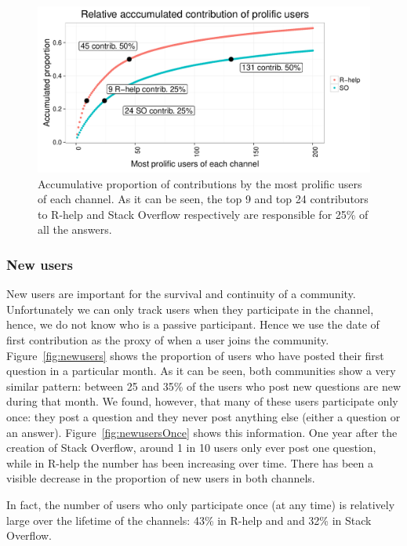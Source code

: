 \documentclass[smallextended]{svjour3}       %
\newcommand{\SO}{Stack Overflow\xspace}
\newcommand{\RH}{R-help\xspace}
\begin{document}
\begin{figure}[htbp]
  \centering
  \includegraphics[width=.95\textwidth]{figs/prolific.pdf}
  \caption{Accumulative proportion of contributions by the most prolific users of each channel. As it can be seen, the
    top 9 and top 24
    contributors to \RH and \SO respectively  are responsible for 25\% of all the answers.}
  \label{fig:prolific}
\end{figure}

\subsubsection{New users}

New users are important for the survival and continuity of a community. Unfortunately we can only track users when they
participate in the channel, hence, we do not know who is a passive participant. Hence we use the date of first
contribution as the proxy of when a user joins the community.  Figure~\ref{fig:newusers} shows the proportion of users
who have posted their first question in a particular month. As it can be seen, both communities show a very similar
pattern: between 25 and 35\% of the users who post new questions are new during that month. We found, however, that many
of these users participate only once: they post a question and they never post anything else (either a question or an
answer). Figure~\ref{fig:newusersOnce} shows this information. One year after the creation of \SO, around 1 in 10 users
only ever post one question, while in \RH the number has been increasing over time. There has been a visible decrease in
the proportion of new users in both channels.

In fact, the number of users who only participate once (at any time) is relatively large over the lifetime of the channels: 43\% in
\RH and and 32\% in \SO.
\end{document}

